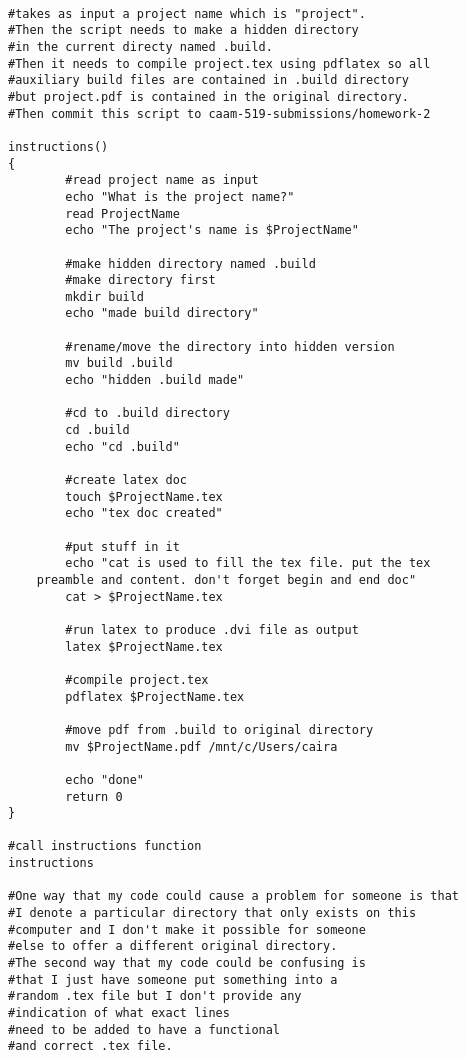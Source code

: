 \documentclass[11pt]{article}
\begin{document}
\lstset{language=bash, basicstyle=\large}
\begin{lstlisting}

#takes as input a project name which is "project". 
#Then the script needs to make a hidden directory 
#in the current directy named .build. 
#Then it needs to compile project.tex using pdflatex so all 
#auxiliary build files are contained in .build directory 
#but project.pdf is contained in the original directory. 
#Then commit this script to caam-519-submissions/homework-2

instructions()
{
        #read project name as input
        echo "What is the project name?"
        read ProjectName
        echo "The project's name is $ProjectName"

        #make hidden directory named .build
        #make directory first
        mkdir build
        echo "made build directory"

        #rename/move the directory into hidden version
        mv build .build
        echo "hidden .build made"

        #cd to .build directory
        cd .build
        echo "cd .build"

        #create latex doc
        touch $ProjectName.tex
        echo "tex doc created"

        #put stuff in it
        echo "cat is used to fill the tex file. put the tex 
	preamble and content. don't forget begin and end doc"
        cat > $ProjectName.tex

        #run latex to produce .dvi file as output
        latex $ProjectName.tex

        #compile project.tex
        pdflatex $ProjectName.tex

        #move pdf from .build to original directory
        mv $ProjectName.pdf /mnt/c/Users/caira

        echo "done"
        return 0
}

#call instructions function
instructions

#One way that my code could cause a problem for someone is that
#I denote a particular directory that only exists on this 
#computer and I don't make it possible for someone 
#else to offer a different original directory. 
#The second way that my code could be confusing is 
#that I just have someone put something into a 
#random .tex file but I don't provide any 
#indication of what exact lines 
#need to be added to have a functional 
#and correct .tex file. 
  
\end{lstlisting}
\end{document}
